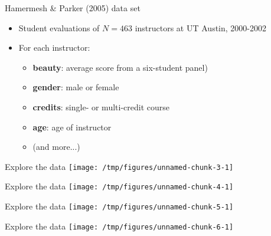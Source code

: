 \documentclass{beamer}\usepackage[]{graphicx}\usepackage[]{color}
\newenvironment{knitrout}{}{} %
\begin{document}
\begin{darkframes}
    \begin{frame}{Hamermesh \& Parker (2005) data set}
      \begin{itemize}
        \item Student evaluations of $N=463$ instructors at UT Austin, 2000-2002
        \item For each instructor:
          \begin{itemize}
            \item \textbf{beauty}: average score from a six-student panel)
            \item \textbf{gender}: male or female
            \item \textbf{credits}: single- or multi-credit course
            \item \textbf{age}: age of instructor
            \item (and more...)
          \end{itemize}
      \end{itemize}
    \end{frame}

    

    \begin{frame}{Explore the data}
\begin{knitrout}
\color{fgcolor}
\texttt{[image: /tmp/figures/unnamed-chunk-3-1]} 

\end{knitrout}
    \end{frame}

    \begin{frame}{Explore the data}
\begin{knitrout}
\color{fgcolor}
\texttt{[image: /tmp/figures/unnamed-chunk-4-1]} 

\end{knitrout}
    \end{frame}

    \begin{frame}{Explore the data}
\begin{knitrout}
\color{fgcolor}
\texttt{[image: /tmp/figures/unnamed-chunk-5-1]} 

\end{knitrout}
    \end{frame}

    \begin{frame}{Explore the data}
\begin{knitrout}
\color{fgcolor}
\texttt{[image: /tmp/figures/unnamed-chunk-6-1]} 


\end{knitrout}
\end{frame}
\end{darkframes}
\end{document}
